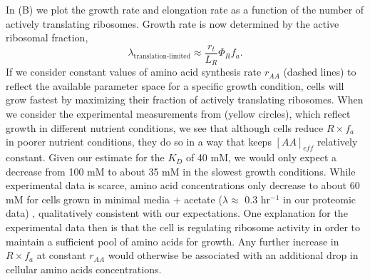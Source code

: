 In (B) we plot the growth rate and elongation rate
as a function of the number of actively translating ribosomes. Growth rate is now
determined by the active ribosomal fraction,\begin{equation}
\lambda_{\textrm{translation-limited}} \approx \frac{r_t}{L_R}  \Phi_R f_a.
\label{eq:translation_limit_growth_rate_2}
\end{equation}
If we consider constant values of amino acid synthesis rate $r_{AA}$ (dashed
lines) to reflect the available parameter space for a specific growth condition,
cells will grow fastest by maximizing their fraction of actively translating
ribosomes. When we consider the experimental measurements from \cite{dai2018}
(yellow circles), which reflect growth in different nutrient conditions, we see
that although cells reduce $R \times f_a$ in poorer nutrient conditions, they do
so in a way that keeps $[AA]_{eff}$ relatively constant. Given our estimate for
the $K_D$ of 40 mM,  we would only expect a decrease from 100 mM to about 35 mM
in the slowest growth conditions. While experimental data is scarce, amino acid
concentrations only decrease to about 60 mM for cells grown in minimal media +
acetate ($\lambda \approx$  0.3 hr$^{-1}$ in our proteomic data)
\citep{bennett2009}, qualitatively consistent with our expectations.  One
explanation for the experimental data then  is that the cell is regulating
ribosome activity in order to maintain a sufficient pool of amino acids for
growth. Any further increase in $R \times f_a$ at constant $r_{AA}$ would
otherwise be associated with an additional drop in cellular amino acids
concentrations.

